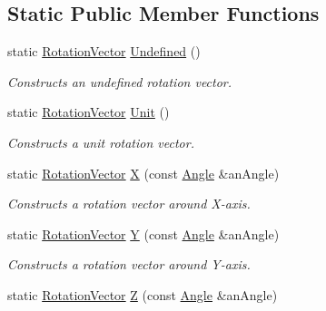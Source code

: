 \subsection*{Static Public Member Functions}
\begin{DoxyCompactItemize}
\item 
static \hyperlink{classlibrary_1_1math_1_1geom_1_1d3_1_1trf_1_1rot_1_1_rotation_vector}{Rotation\+Vector} \hyperlink{classlibrary_1_1math_1_1geom_1_1d3_1_1trf_1_1rot_1_1_rotation_vector_a4ab50dc44c938485c102c4c70006c04b}{Undefined} ()
\begin{DoxyCompactList}\small\item\em Constructs an undefined rotation vector. \end{DoxyCompactList}\item 
static \hyperlink{classlibrary_1_1math_1_1geom_1_1d3_1_1trf_1_1rot_1_1_rotation_vector}{Rotation\+Vector} \hyperlink{classlibrary_1_1math_1_1geom_1_1d3_1_1trf_1_1rot_1_1_rotation_vector_ae8dcd99b54ffcffee6906b526a8d2769}{Unit} ()
\begin{DoxyCompactList}\small\item\em Constructs a unit rotation vector. \end{DoxyCompactList}\item 
static \hyperlink{classlibrary_1_1math_1_1geom_1_1d3_1_1trf_1_1rot_1_1_rotation_vector}{Rotation\+Vector} \hyperlink{classlibrary_1_1math_1_1geom_1_1d3_1_1trf_1_1rot_1_1_rotation_vector_a6b4cb091dd380a071faa158cbdd1b7ea}{X} (const \hyperlink{classlibrary_1_1math_1_1geom_1_1_angle}{Angle} \&an\+Angle)
\begin{DoxyCompactList}\small\item\em Constructs a rotation vector around X-\/axis. \end{DoxyCompactList}\item 
static \hyperlink{classlibrary_1_1math_1_1geom_1_1d3_1_1trf_1_1rot_1_1_rotation_vector}{Rotation\+Vector} \hyperlink{classlibrary_1_1math_1_1geom_1_1d3_1_1trf_1_1rot_1_1_rotation_vector_a0fa2ba6e7806d5e72419f64f708518d4}{Y} (const \hyperlink{classlibrary_1_1math_1_1geom_1_1_angle}{Angle} \&an\+Angle)
\begin{DoxyCompactList}\small\item\em Constructs a rotation vector around Y-\/axis. \end{DoxyCompactList}\item 
static \hyperlink{classlibrary_1_1math_1_1geom_1_1d3_1_1trf_1_1rot_1_1_rotation_vector}{Rotation\+Vector} \hyperlink{classlibrary_1_1math_1_1geom_1_1d3_1_1trf_1_1rot_1_1_rotation_vector_a237e163d88d5c80ee8dcb3a6c68e0e4b}{Z} (const \hyperlink{classlibrary_1_1math_1_1geom_1_1_angle}{Angle} \&an\+Angle)

\end{DoxyCompactItemize}
